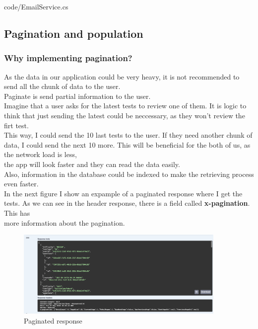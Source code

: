             
            {code/EmailService.cs}

    \subsection{Pagination and population}
        \subsubsection{Why implementing pagination?}
            As the data in our application could be very heavy, it is not recommended to send all the chunk of data to the user. \\
            Paginate is send partial information to the user. \\

            Imagine that a user asks for the latest tests to review one of them. It is logic to think that just sending the latest could be neccessary, as they won't review the firt test. \\
            This way, I could send the 10 last tests to the user. If they need another chunk of data, I could send the next 10 more. This will be beneficial for the both of us, as the network load is less, \\
            the app will look faster and they can read the data easily. \\
            Also, information in the database could be indexed to make the retrieving process even faster. \\

            In the next figure I show an expample of a paginated response where I get the tests. As we can see in the header response, there is a field called \textbf{x-pagination}. This has \\
            more information about the pagination.

            \begin{figure}[H]
                \centering
                    \includegraphics[width=0.9\textwidth]{assets/pagination.png}
                \caption{Paginated response}
                \label{fig:impl_pagination}
            \end{figure}

